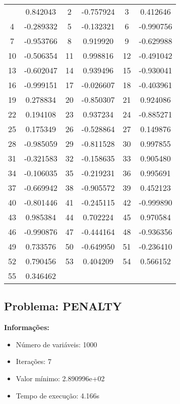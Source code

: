 \documentclass[12pt]{article}
\begin{document}
\begin{longtable}{@{}cc|cc|cc@{}}
\bottomrule
\endlastfoot
1 & 0.842043 & 2 & -0.757924 & 3 & 0.412646 \\
4 & -0.289332 & 5 & -0.132321 & 6 & -0.990756 \\
7 & -0.953766 & 8 & 0.919920 & 9 & -0.629988 \\
10 & -0.506354 & 11 & 0.998816 & 12 & -0.491042 \\
13 & -0.602047 & 14 & 0.939496 & 15 & -0.930041 \\
16 & -0.999151 & 17 & -0.026607 & 18 & -0.403961 \\
19 & 0.278834 & 20 & -0.850307 & 21 & 0.924086 \\
22 & 0.194108 & 23 & 0.937234 & 24 & -0.885271 \\
25 & 0.175349 & 26 & -0.528864 & 27 & 0.149876 \\
28 & -0.985059 & 29 & -0.811528 & 30 & 0.997855 \\
31 & -0.321583 & 32 & -0.158635 & 33 & 0.905480 \\
34 & -0.106035 & 35 & -0.219231 & 36 & 0.995691 \\
37 & -0.669942 & 38 & -0.905572 & 39 & 0.452123 \\
40 & -0.801446 & 41 & -0.245115 & 42 & -0.999890 \\
43 & 0.985384 & 44 & 0.702224 & 45 & 0.970584 \\
46 & -0.990876 & 47 & -0.444164 & 48 & -0.936356 \\
49 & 0.733576 & 50 & -0.649950 & 51 & -0.236410 \\
52 & 0.790456 & 53 & 0.404209 & 54 & 0.566152 \\
55 & 0.346462 &  &  &  &  \\

\end{longtable}


\newpage            
\subsection{Problema: PENALTY}

\textbf{Informações:}
\begin{itemize}
\item Número de variáveis: 1000
\item Iterações: 7
\item Valor mínimo: 2.890996e+02
\item Tempo de execução: 4.166s
\end{itemize}
\end{document}

